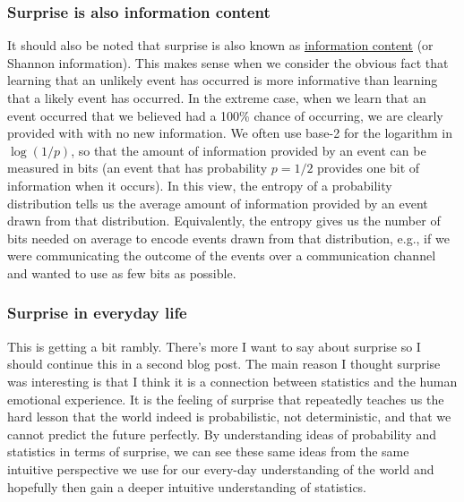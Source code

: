 \documentclass{article}
\begin{document}
\subsubsection*{Surprise is also information content}
It should also be noted that surprise is also known as \href{https://en.wikipedia.org/wiki/Information_content}{information content} (or Shannon information). This makes sense when we consider the obvious fact that learning that an unlikely event has occurred is more informative than learning that a likely event has occurred. In the extreme case, when we learn that an event occurred that we believed had a 100\% chance of occurring, we are clearly provided with with no new information. We often use base-2 for the logarithm in $\log(1/p)$, so that the amount of information provided by an event can be measured in bits (an event that has probability $p=1/2$ provides one bit of information when it occurs). In this view, the entropy of a probability distribution tells us the average amount of information provided by an event drawn from that distribution. Equivalently, the entropy gives us the number of bits needed on average to encode events drawn from that distribution, e.g., if we were communicating the outcome of the events over a communication channel and wanted to use as few bits as possible. 

\subsubsection*{Surprise in everyday life}
This is getting a bit rambly. There's more I want to say about surprise so I should continue this in a second blog post. The main reason I thought surprise was interesting is that I think it is a connection between statistics and the human emotional experience. It is the feeling of surprise that repeatedly teaches us the hard lesson that the world indeed is probabilistic, not deterministic, and that we cannot predict the future perfectly. By understanding ideas of probability and statistics in terms of surprise, we can see these same ideas from the same intuitive perspective we use for our every-day understanding of the world and hopefully then gain a deeper intuitive understanding of statistics. 
\end{document}
